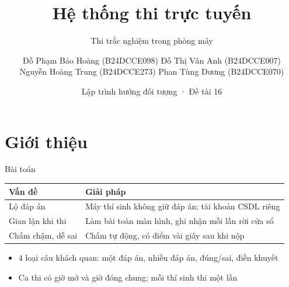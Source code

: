 \documentclass[aspectratio=169,11pt]{beamer}
\title[Hệ thống thi trực tuyến]{Hệ thống thi trực tuyến}
\subtitle{Thi trắc nghiệm trong phòng máy}
\author[Nhóm 2]{%
  Đỗ Phạm Bảo Hoàng {\scriptsize(B24DCCE098)} \quad Đỗ Thị Vân Anh {\scriptsize(B24DCCE007)}\\[2pt]
  Nguyễn Hoàng Trung {\scriptsize(B24DCCE273)} \quad Phan Tùng Dương {\scriptsize(B24DCCE070)}}
\institute[D24CQCE07-B]{Lớp D24CQCE07-B \quad Giảng viên: Phạm Hoàng Việt}
\date[Đề tài 16]{Lập trình hướng đối tượng · Đề tài 16}
\begin{document}
\begin{frame}
  \titlepage
\end{frame}

\section{Giới thiệu}
\begin{frame}{Bài toán}
  \centering\renewcommand{\arraystretch}{1.3}
  \begin{tabular}{@{}p{}p{}@{}}
    \toprule
    \textbf{Vấn đề} & \textbf{Giải pháp} \\
    \midrule
    Lộ đáp án          & Máy thí sinh không giữ đáp án; tài khoản CSDL riêng \\
    Gian lận khi thi   & Làm bài toàn màn hình, ghi nhận mỗi lần rời cửa sổ \\
    Chấm chậm, dễ sai  & Chấm tự động, có điểm vài giây sau khi nộp \\
    \bottomrule
  \end{tabular}
  \vspace{1.2em}
  \begin{itemize}
    \item 4 loại câu khách quan: một đáp án, nhiều đáp án, đúng/sai, điền khuyết
    \item Ca thi có giờ mở và giờ đóng chung; mỗi thí sinh thi một lần
  \end{itemize}
\end{frame}

\end{document}
